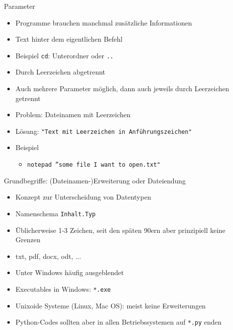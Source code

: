 
\begin{frame}{Parameter}
%
\begin{itemize}
\item Programme brauchen manchmal zusätzliche Informationen
\item Text hinter dem eigentlichen Befehl
\item Beispiel \texttt{cd}: Unterordner oder \texttt{..}
\item Durch Leerzeichen abgetrennt
\item Auch mehrere Parameter möglich, dann auch jeweils durch Leerzeichen getrennt
\item Problem: Dateinamen mit Leerzeichen
\item Lösung: \texttt{"Text mit Leerzeichen in Anführungszeichen"}
\item Beispiel
	\begin{itemize}
	\item \texttt{notepad ''some file I want to open.txt"}
	\end{itemize}
\end{itemize}
%
\end{frame}


\begin{frame}{Grundbegriffe: (Dateinamen-)Erweiterung oder Dateiendung}
%
\begin{itemize}
\item Konzept zur Unterscheidung von Datentypen
\item Namenschema \texttt{Inhalt.Typ}
\item Üblicherweise 1-3 Zeichen, seit den späten 90ern aber prinzipiell keine Grenzen
\item txt, pdf, docx, odt, ...
\item Unter Windows häufig ausgeblendet
\item Executables in Windows: \texttt{*.exe}
\item Unixoide Systeme (Linux, Mac OS): meist keine Erweiterungen
\item Python-Codes sollten aber in allen Betriebssystemen auf \texttt{*.py} enden
\end{itemize}
%
\end{frame}


